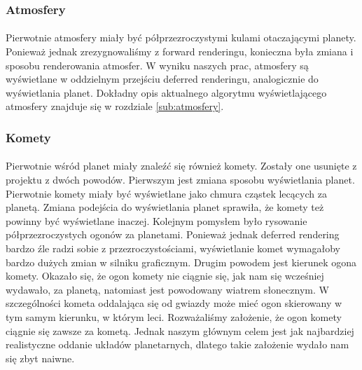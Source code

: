 \subsubsection{Atmosfery}\label{ssub:atmosfery}
\paragraph{}

Pierwotnie atmosfery miały być półprzezroczystymi kulami otaczającymi planety. Ponieważ jednak zrezygnowaliśmy z forward renderingu, konieczna była zmiana i sposobu renderowania atmosfer. W wyniku naszych prac, atmosfery są wyświetlane w oddzielnym przejściu deferred renderingu, analogicznie do wyświetlania planet. Dokładny opis aktualnego algorytmu wyświetlającego atmosfery znajduje się w rozdziale \hyperref[sub:atmosfery]{\ref{sub:atmosfery}}.

\subsubsection{Komety}\label{ssub:komety}
\paragraph{}

Pierwotnie wśród planet miały znaleźć się również komety. Zostały one usunięte z projektu z dwóch powodów. Pierwszym jest zmiana sposobu wyświetlania planet. Pierwotnie komety miały być wyświetlane jako chmura cząstek lecących za planetą. Zmiana podejścia do wyświetlania planet sprawiła, że komety też powinny być wyświetlane inaczej. Kolejnym pomysłem było rysowanie półprzezroczystych ogonów za planetami. Ponieważ jednak deferred rendering bardzo źle radzi sobie z przezroczystościami, wyświetlanie komet wymagałoby bardzo dużych zmian w silniku graficznym. Drugim powodem jest kierunek ogona komety. Okazało się, że ogon komety nie ciągnie się, jak nam się wcześniej wydawało, za planetą, natomiast jest powodowany wiatrem słonecznym. W szczególności kometa oddalająca się od gwiazdy może mieć ogon skierowany w tym samym kierunku, w którym leci. Rozważaliśmy założenie, że ogon komety ciągnie się zawsze za kometą. Jednak naszym głównym celem jest jak najbardziej realistyczne oddanie układów planetarnych, dlatego takie założenie wydało nam się zbyt naiwne.

\paragraph{}

